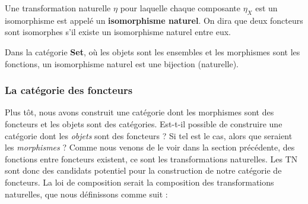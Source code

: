 \documentclass{article}
\begin{document}
\begin{center}
\end{center}

\begin{definition}{}
    Une transformation naturelle $\eta$ pour laquelle chaque composante $\eta_X$ est un isomorphisme est appelé un \textbf{isomorphisme naturel}. On dira que deux foncteurs sont isomorphes s'il existe un isomorphisme naturel entre eux.
\end{definition}

\begin{example}[]{}
    Dans la catégorie \textbf{Set}, où les objets sont les ensembles et les morphismes sont les fonctions, un isomorphisme naturel est une bijection (naturelle).
\end{example}

\subsubsection{La catégorie des foncteurs}
Plus tôt, nous avons construit une catégorie dont les morphismes sont des foncteurs et les objets sont des catégories. Est-t-il possible de construire une catégorie dont les \textit{objets} sont des foncteurs ? Si tel est le cas, alors que seraient les \textit{morphismes} ? Comme nous venons de le voir dans la section précédente, des fonctions entre foncteurs existent, ce sont les transformations naturelles. Les TN sont donc des candidats potentiel pour la construction de notre catégorie de foncteurs. La loi de composition serait la composition des transformations naturelles, que nous définissons comme suit :
\end{document}
